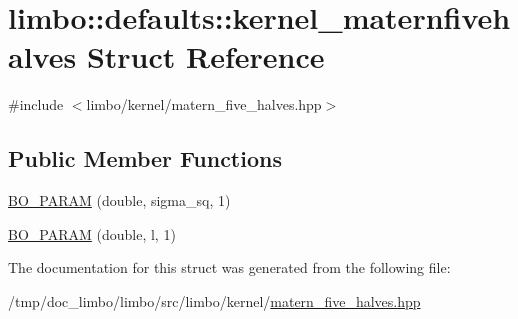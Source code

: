 \hypertarget{structlimbo_1_1defaults_1_1kernel__maternfivehalves}{}\section{limbo\+:\+:defaults\+:\+:kernel\+\_\+maternfivehalves Struct Reference}
\label{structlimbo_1_1defaults_1_1kernel__maternfivehalves}


{\ttfamily \#include $<$limbo/kernel/matern\+\_\+five\+\_\+halves.\+hpp$>$}

\subsection*{Public Member Functions}
\begin{DoxyCompactItemize}
\item 
\hyperlink{group__kernel__defaults_ga001b0195485017f316c32002aba15139}{B\+O\+\_\+\+P\+A\+R\+A\+M} (double, sigma\+\_\+sq, 1)
\item 
\hyperlink{group__kernel__defaults_gabc34e7cdebd3b2db4ffa355ac8eb51e9}{B\+O\+\_\+\+P\+A\+R\+A\+M} (double, l, 1)
\end{DoxyCompactItemize}


The documentation for this struct was generated from the following file\+:\begin{DoxyCompactItemize}
\item 
/tmp/doc\+\_\+limbo/limbo/src/limbo/kernel/\hyperlink{matern__five__halves_8hpp}{matern\+\_\+five\+\_\+halves.\+hpp}\end{DoxyCompactItemize}
